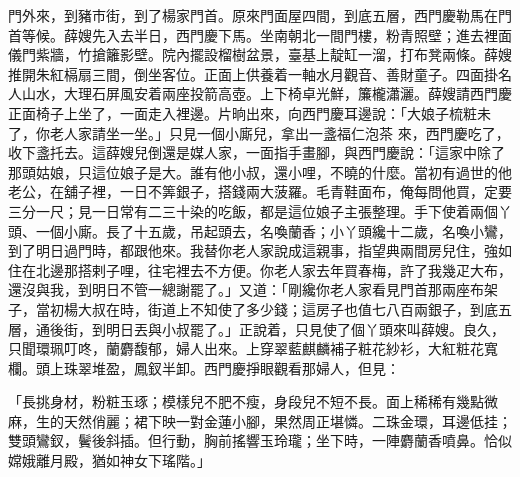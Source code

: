 門外來，到豬市街，到了楊家門首。原來門面屋四間，到底五層，西門慶勒馬在門首等候。薛嫂先入去半日，西門慶下馬。坐南朝北一間門樓，粉青照壁；進去裡面儀門紫牆，竹搶籬影壁。院內擺設榴樹盆景，臺基上靛缸一溜，打布凳兩條。薛嫂推開朱紅槅扇三間，倒坐客位。正面上供養着一軸水月觀音、善財童子。四面掛名人山水，大理石屏風安着兩座投箭高壺。上下椅卓光鮮，簾櫳瀟灑。薛嫂請西門慶正面椅子上坐了，一面走入裡邊。片晌出來，向西門慶耳邊說：「大娘子梳粧未了，你老人家請坐一坐。」只見一個小廝兒，拿出一盞福仁泡茶 來，西門慶吃了，收下盞托去。這薛嫂兒倒還是媒人家，一面指手畫腳，與西門慶說：「這家中除了那頭姑娘，只這位娘子是大。誰有他小叔，還小哩，不曉的什麼。當初有過世的他老公，在舖子裡，一日不筭銀子，搭錢兩大菠羅。毛青鞋面布，俺每問他買，定要三分一尺；見一日常有二三十染的吃飯，都是這位娘子主張整理。手下使着兩個丫頭、一個小廝。長了十五歲，吊起頭去，名喚蘭香；小丫頭纔十二歲，名喚小鸞，到了明日過門時，都跟他來。我替你老人家說成這親事，指望典兩間房兒住，強如住在北邊那搭剌子哩，往宅裡去不方便。你老人家去年買春梅，許了我幾疋大布，還沒與我，到明日不管一總謝罷了。」又道：「剛纔你老人家看見門首那兩座布架子，當初楊大叔在時，街道上不知使了多少錢；這房子也值七八百兩銀子，到底五層，通後街，到明日丟與小叔罷了。」正說着，只見使了個丫頭來叫薛嫂。良久，只聞環珮叮咚，蘭麝馥郁，婦人出來。上穿翠藍麒麟補子粧花紗衫，大紅粧花寬欄。頭上珠翠堆盈，鳳釵半卸。西門慶掙眼觀看那婦人，但見：

「長挑身材，粉粧玉琢；模樣兒不肥不瘦，身段兒不短不長。面上稀稀有幾點微麻，生的天然俏麗；裙下映一對金蓮小腳，果然周正堪憐。二珠金環，耳邊低挂；雙頭鸞釵，鬢後斜插。但行動，胸前搖響玉玲瓏；坐下時，一陣麝蘭香噴鼻。恰似嫦娥離月殿，猶如神女下瑤階。」

